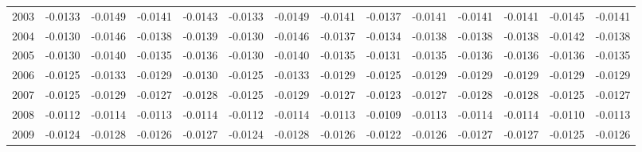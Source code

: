 \begin{tabular}{cccccccccccccc}
  2003 & -0.0133 & -0.0149 & -0.0141 & -0.0143 & -0.0133 & -0.0149 & -0.0141 & -0.0137 & -0.0141 & -0.0141 & -0.0141 & -0.0145 & -0.0141 \\ 
  2004 & -0.0130 & -0.0146 & -0.0138 & -0.0139 & -0.0130 & -0.0146 & -0.0137 & -0.0134 & -0.0138 & -0.0138 & -0.0138 & -0.0142 & -0.0138 \\ 
  2005 & -0.0130 & -0.0140 & -0.0135 & -0.0136 & -0.0130 & -0.0140 & -0.0135 & -0.0131 & -0.0135 & -0.0136 & -0.0136 & -0.0136 & -0.0135 \\ 
  2006 & -0.0125 & -0.0133 & -0.0129 & -0.0130 & -0.0125 & -0.0133 & -0.0129 & -0.0125 & -0.0129 & -0.0129 & -0.0129 & -0.0129 & -0.0129 \\ 
  2007 & -0.0125 & -0.0129 & -0.0127 & -0.0128 & -0.0125 & -0.0129 & -0.0127 & -0.0123 & -0.0127 & -0.0128 & -0.0128 & -0.0125 & -0.0127 \\ 
  2008 & -0.0112 & -0.0114 & -0.0113 & -0.0114 & -0.0112 & -0.0114 & -0.0113 & -0.0109 & -0.0113 & -0.0114 & -0.0114 & -0.0110 & -0.0113 \\ 
  2009 & -0.0124 & -0.0128 & -0.0126 & -0.0127 & -0.0124 & -0.0128 & -0.0126 & -0.0122 & -0.0126 & -0.0127 & -0.0127 & -0.0125 & -0.0126 \\ 
   \hline
\end{tabular}
